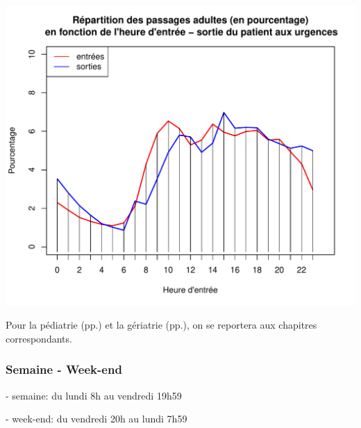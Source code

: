 \documentclass[12pt,english,french,twoside]{book}\usepackage[]{graphicx}\usepackage[]{color}
\makeatletter
\def\maxwidth{ %
  \ifdim\Gin@nat@width>\linewidth
    \linewidth
  \else
    \Gin@nat@width
  \fi
}
\newenvironment{knitrout}{}{} %
\makeatother
\begin{document}
\begin{knitrout}
\color{fgcolor}
\includegraphics[width=\maxwidth]{figure/es_adultes} 

\end{knitrout}


Pour la pédiatrie (pp.\pageref{chap_pediatrie}) et la gériatrie (pp.\pageref{chap_geriatrie}), on se reportera aux chapitres correspondants.

\subsubsection*{Semaine - Week-end}

- semaine: du lundi 8h au vendredi 19h59

- week-end: du vendredi 20h au lundi 7h59
\end{document}
